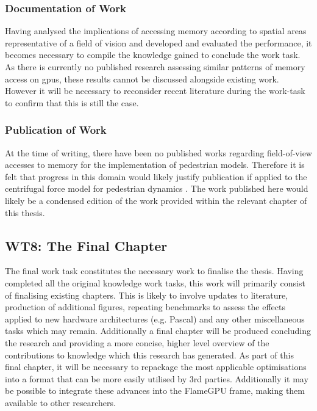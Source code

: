       \subsubsection*{Documentation of Work}
        Having analysed the implications of accessing memory according to spatial areas representative of a field of vision and developed and evaluated the performance, it becomes necessary to compile the knowledge gained to conclude the work task. As there is currently no published research assessing similar patterns of memory access on \glspl{gpu}, these results cannot be discussed alongside existing work. However it will be necessary to reconsider recent literature during the work-task to confirm that this is still the case.
      
      \subsubsection*{Publication of Work}
        At the time of writing, there have been no published works regarding field-of-view accesses to memory for the implementation of pedestrian models. Therefore it is felt that progress in this domain would likely justify publication if applied to the centrifugal force model for pedestrian dynamics \cite{YC*05}. The work published here would likely be a condensed edition of the work provided within the relevant chapter of this thesis.
        
    \subsection{WT8: The Final Chapter}
      The final work task constitutes the necessary work to finalise the thesis. Having completed all the original knowledge work tasks, this work will primarily consist of finalising existing chapters. This is likely to involve updates to literature, production of additional figures, repeating benchmarks to assess the effects applied to new hardware architectures (e.g. Pascal) and any other miscellaneous tasks which may remain. Additionally a final chapter will be produced concluding the research and providing a more concise, higher level overview of the contributions to knowledge which this research has generated. As part of this final chapter, it will be necessary to repackage the most applicable optimisations into a format that can be more easily utilised by 3rd parties. Additionally it may be possible to integrate these advances into the FlameGPU frame, making them available to other researchers.
      
